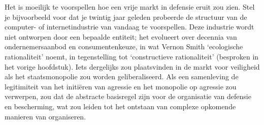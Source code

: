 Het is moeilijk te voorspellen hoe een vrije markt in defensie eruit zou zien. Stel je bijvoorbeeld voor dat je twintig jaar geleden probeerde de structuur van de computer- of internetindustrie van vandaag te voorspellen. Deze industrie wordt niet ontworpen door een bepaalde entiteit; het evolueert over decennia van ondernemersaanbod en consumentenkeuze, in wat Vernon Smith `ecologische rationaliteit' noemt, in tegenstelling tot `constructieve rationaliteit' (besproken in het vorige hoofdstuk). Iets dergelijks zou plaatsvinden in de markt voor veiligheid als het staatsmonopolie zou worden geliberaliseerd. Als een samenleving de legitimiteit van het initiëren van agressie en het monopolie op agressie zou verwerpen, zou dat de abstracte basisregel zijn voor de organisatie van defensie en bescherming, wat zou leiden tot het ontstaan van complexe opkomende manieren van organiseren.

